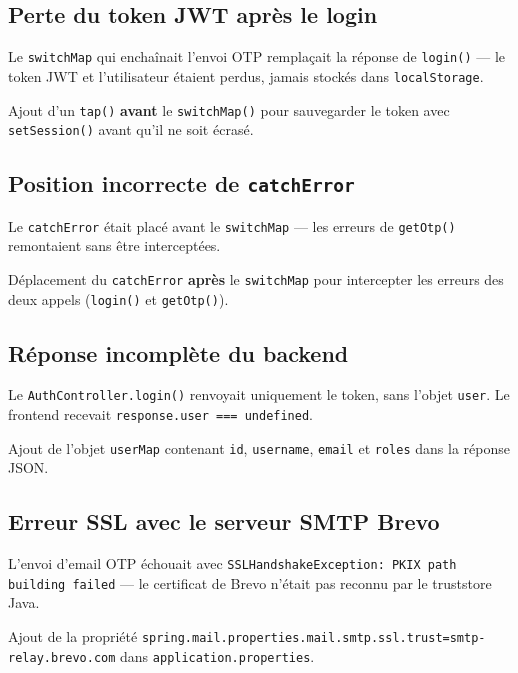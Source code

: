\documentclass[a4paper,12pt,french]{article}
\begin{document}
\subsection{Perte du token JWT après le login}
\begin{problembox}
Le \texttt{switchMap} qui enchaînait l'envoi OTP remplaçait la réponse de \texttt{login()} — le token JWT et l'utilisateur étaient perdus, jamais stockés dans \texttt{localStorage}.
\end{problembox}
\begin{solutionbox}
Ajout d'un \texttt{tap()} \textbf{avant} le \texttt{switchMap()} pour sauvegarder le token avec \texttt{setSession()} avant qu'il ne soit écrasé.
\end{solutionbox}

\subsection{Position incorrecte de \texttt{catchError}}
\begin{problembox}
Le \texttt{catchError} était placé avant le \texttt{switchMap} — les erreurs de \texttt{getOtp()} remontaient sans être interceptées.
\end{problembox}
\begin{solutionbox}
Déplacement du \texttt{catchError} \textbf{après} le \texttt{switchMap} pour intercepter les erreurs des deux appels (\texttt{login()} et \texttt{getOtp()}).
\end{solutionbox}

\subsection{Réponse incomplète du backend}
\begin{problembox}
Le \texttt{AuthController.login()} renvoyait uniquement le token, sans l'objet \texttt{user}. Le frontend recevait \texttt{response.user === undefined}.
\end{problembox}
\begin{solutionbox}
Ajout de l'objet \texttt{userMap} contenant \texttt{id}, \texttt{username}, \texttt{email} et \texttt{roles} dans la réponse JSON.
\end{solutionbox}

\subsection{Erreur SSL avec le serveur SMTP Brevo}
\begin{problembox}
L'envoi d'email OTP échouait avec \texttt{SSLHandshakeException: PKIX path building failed} — le certificat de Brevo n'était pas reconnu par le truststore Java.
\end{problembox}
\begin{solutionbox}
Ajout de la propriété \texttt{spring.mail.properties.mail.smtp.ssl.trust=smtp-relay.brevo.com} dans \texttt{application.properties}.
\end{solutionbox}
\end{document}
